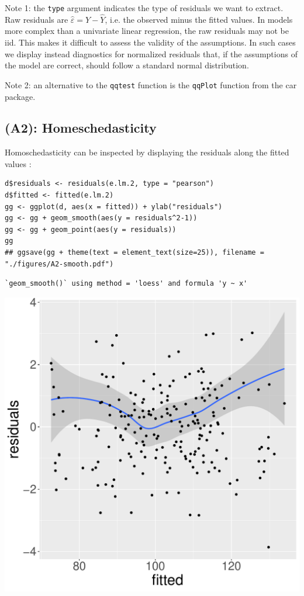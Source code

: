 \documentclass[12pt]{article}
\begin{document}
\bigskip

Note 1: the \texttt{type} argument indicates the type of residuals we want to
extract. Raw residuals are \(\hat{\varepsilon} = Y-\hat{Y}\), i.e. the
observed minus the fitted values. In models more complex than a
univariate linear regression, the raw residuals may not be iid. This
makes it difficult to assess the validity of the assumptions. In such
cases we display instead diagnostics for normalized residuals that, if
the assumptions of the model are correct, should follow a standard
normal distribution.

\bigskip

Note 2: an alternative to the \texttt{qqtest} function is the \texttt{qqPlot}
function from the car package.

\subsection{\textbf{(A2)}: Homeschedasticity}
\label{sec:org5982029}
Homoschedasticity can be inspected by displaying the residuals along
the fitted values :
\lstset{language=r,label= ,caption= ,captionpos=b,numbers=none}
\begin{lstlisting}
d$residuals <- residuals(e.lm.2, type = "pearson")
d$fitted <- fitted(e.lm.2)
gg <- ggplot(d, aes(x = fitted)) + ylab("residuals")
gg <- gg + geom_smooth(aes(y = residuals^2-1))
gg <- gg + geom_point(aes(y = residuals))
gg
## ggsave(gg + theme(text = element_text(size=25)), filename = "./figures/A2-smooth.pdf")
\end{lstlisting}

\begin{verbatim}
`geom_smooth()` using method = 'loess' and formula 'y ~ x'
\end{verbatim}

\begin{center}
\includegraphics[width=.9\linewidth]{./figures/A2-smooth.pdf}
\end{center}
\end{document}
